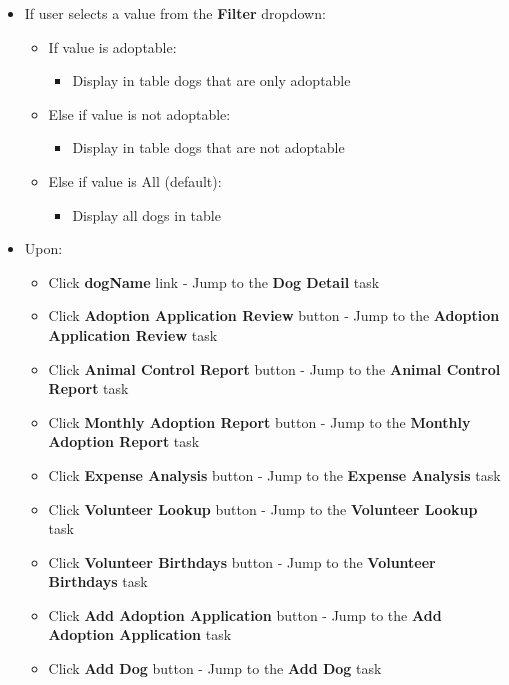 \documentclass{article}
\begin{document}
\begin{itemize}
\begin{itemize}
    \end{itemize}
    \item If user selects a value from the \textbf{Filter} dropdown:
    \begin{itemize}
        \item If value is adoptable:
        \begin{itemize}
            \item Display in table dogs that are only adoptable
        \end{itemize}
        \item Else if value is not adoptable:
        \begin{itemize}
            \item Display in table dogs that are not adoptable
        \end{itemize}
        \item Else if value is All (default):
        \begin{itemize}
            \item Display all dogs in table
        \end{itemize}
    \end{itemize}
    \item Upon:
    \begin{itemize}
        \item Click \textbf{dogName} link - Jump to the \textbf{Dog Detail} task
        \item Click \textbf{Adoption Application Review} button - Jump to the \textbf{Adoption Application Review} task
        \item Click \textbf{Animal Control Report} button - Jump to the \textbf{Animal Control Report} task
        \item Click \textbf{Monthly Adoption Report} button - Jump to the \textbf{Monthly Adoption Report} task
        \item Click \textbf{Expense Analysis} button - Jump to the \textbf{Expense Analysis} task
        \item Click \textbf{Volunteer Lookup} button - Jump to the \textbf{Volunteer Lookup} task
        \item Click \textbf{Volunteer Birthdays} button - Jump to the \textbf{Volunteer Birthdays} task
        \item Click \textbf{Add Adoption Application} button - Jump to the \textbf{Add Adoption Application} task
        \item Click \textbf{Add Dog} button - Jump to the \textbf{Add Dog} task
    \end{itemize}
\end{itemize}
\end{document}
